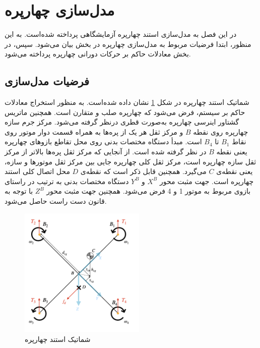 \documentclass{CCI2020}
\begin{document}
\section{مدل‌سازی چهارپره}
در این فصل به مدل‌سازی استند چهارپره آزمایشگاهی پرداخته شده‌است. به این منظور، ابتدا فرضیات مربوط به مدل‌سازی چهارپره در بخش بیان می‌شود. سپس، در بخش معادلات حاکم بر حرکات دورانی چهارپره پرداخته می‌شود.

\subsection{فرضیات مدل‌سازی}
شماتیک استند چهارپره در شكل \ref{QuadAssum} نشان داده شده‌است. به ‌منظور استخراج معادلات حاکم بر سیستم، 
فرض می‌شود که چهارپره صلب و متقارن است. همچنین ماتریس گشتاور اینرسی چهارپره به‌صورت قطری درنظر گرفته می‌شود. مرکز جرم سازه چهارپره روی نقطه $B$ و مرکز ثقل هر یک از پره‌ها به همراه قسمت دوار موتور روی نقاط 
$B_1$
تا
$B_4$
است. مبدأ دستگاه مختصات بدنی روی محل تقاطع بازوهای چهارپره یعنی نقطه 
$B$
در نظر گرفته شده است. از آنجایی ‌که مرکز ثقل پره‌ها بالاتر از مرکز ثقل سازه چهارپره است، مرکز ثقل کلی چهارپره جایی بین مرکز ثقل موتورها و سازه، یعنی نقطه‌ی 
$C$
می‌گیرد. همچنین قابل ذکر است که نقطه‌ی
$D$
محل اتصال کلی استند چهارپره است. جهت مثبت محور 
$X^B$
و
$Y^B$
دستگاه مختصات بدنی به ترتیب در راستای بازوی مربوط به موتور 1 و 4 فرض می‌شود. همچنین جهت مثبت محور
$Z^B$
با توجه به قانون دست راست حاصل می‌شود.
\begin{figure}[!h]
	\includegraphics[width=6cm]{images/StandAssumations.png}
	\centering
	\caption{شماتیک استند چهارپره}
	\label{QuadAssum}
\end{figure}
\end{document}
